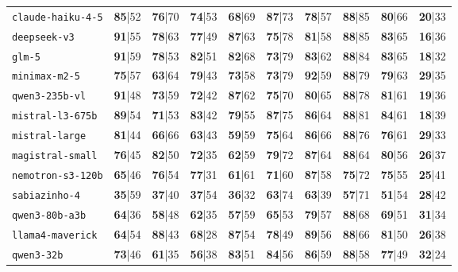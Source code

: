 \documentclass{IOS-Book-Article}
\begin{document}
\begin{table}[!ht]
\begin{tabular}{llrrrrrrrr}
\texttt{claude-haiku-4-5} & \textbf{85}|52 & \textbf{76}|70 & \textbf{74}|53 & \textbf{68}|69 & \textbf{87}|73 & \textbf{78}|57 & \textbf{88}|85 & \textbf{80}|66 & \textbf{20}|33 \\
\texttt{deepseek-v3} & \textbf{91}|55 & \textbf{78}|63 & \textbf{77}|49 & \textbf{87}|63 & \textbf{75}|78 & \textbf{81}|58 & \textbf{88}|85 & \textbf{83}|65 & \textbf{16}|36 \\
\texttt{glm-5} & \textbf{91}|59 & \textbf{78}|53 & \textbf{82}|51 & \textbf{82}|68 & \textbf{73}|79 & \textbf{83}|62 & \textbf{88}|84 & \textbf{83}|65 & \textbf{18}|32 \\
\texttt{minimax-m2-5} & \textbf{75}|57 & \textbf{63}|64 & \textbf{79}|43 & \textbf{73}|58 & \textbf{73}|79 & \textbf{92}|59 & \textbf{88}|79 & \textbf{79}|63 & \textbf{29}|35 \\
\texttt{qwen3-235b-vl} & \textbf{91}|48 & \textbf{73}|59 & \textbf{72}|42 & \textbf{87}|62 & \textbf{75}|70 & \textbf{80}|65 & \textbf{88}|78 & \textbf{81}|61 & \textbf{19}|36 \\
\texttt{mistral-l3-675b} & \textbf{89}|54 & \textbf{71}|53 & \textbf{83}|42 & \textbf{79}|55 & \textbf{87}|75 & \textbf{86}|64 & \textbf{88}|81 & \textbf{84}|61 & \textbf{18}|39 \\
\texttt{mistral-large} & \textbf{81}|44 & \textbf{66}|66 & \textbf{63}|43 & \textbf{59}|59 & \textbf{75}|64 & \textbf{86}|66 & \textbf{88}|76 & \textbf{76}|61 & \textbf{29}|33 \\
\texttt{magistral-small} & \textbf{76}|45 & \textbf{82}|50 & \textbf{72}|35 & \textbf{62}|59 & \textbf{79}|72 & \textbf{87}|64 & \textbf{88}|64 & \textbf{80}|56 & \textbf{26}|37 \\
\texttt{nemotron-s3-120b} & \textbf{65}|46 & \textbf{76}|54 & \textbf{77}|31 & \textbf{61}|61 & \textbf{71}|60 & \textbf{87}|58 & \textbf{75}|72 & \textbf{75}|55 & \textbf{25}|41 \\
\texttt{sabiazinho-4} & \textbf{35}|59 & \textbf{37}|40 & \textbf{37}|54 & \textbf{36}|32 & \textbf{63}|74 & \textbf{63}|39 & \textbf{57}|71 & \textbf{51}|54 & \textbf{28}|42 \\
\texttt{qwen3-80b-a3b} & \textbf{64}|36 & \textbf{58}|48 & \textbf{62}|35 & \textbf{57}|59 & \textbf{65}|53 & \textbf{79}|57 & \textbf{88}|68 & \textbf{69}|51 & \textbf{31}|34 \\
\texttt{llama4-maverick} & \textbf{64}|54 & \textbf{88}|43 & \textbf{68}|28 & \textbf{87}|54 & \textbf{78}|49 & \textbf{89}|56 & \textbf{88}|66 & \textbf{81}|50 & \textbf{26}|38 \\
\texttt{qwen3-32b} & \textbf{73}|46 & \textbf{61}|35 & \textbf{56}|38 & \textbf{83}|51 & \textbf{84}|56 & \textbf{86}|59 & \textbf{88}|58 & \textbf{77}|49 & \textbf{32}|24 \\
\hline
\end{tabular}
\end{table}
\end{document}
